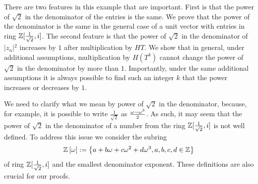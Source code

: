 \documentclass[english,journal]{extarticle}
\theoremstyle{plain}
\theoremstyle{plain}
\theoremstyle{plain}
\theoremstyle{definition}
\theoremstyle{plain}
\theoremstyle{plain}
\begin{document}
There are two features in this example that are important. First
is that the power of $\sqrt{2}$ in the denominator of the entries is
the same. We prove that the power of the denominator is the same
in the general case of a unit vector with entries in ring $\mathbb{Z}[\frac{1}{\sqrt{2}},i]$. The second
feature is that the power of $\sqrt{2}$ in the denominator of
$\left|z_{n}\right|{}^{2}$
increases by $1$ after multiplication by $HT$. We show that
in general, under additional assumptions, multiplication by
$H\left(T^{k}\right)$
cannot change the power of $\sqrt{2}$ in the denominator by more than $1$. Importantly, under the
same additional assumptions it is always possible to find such an integer
$k$ that the power increases or decreases by $1$. 

We need to clarify what we mean by power of $\sqrt{2}$ in the denominator,
because, for example, it is possible to write $\frac{1}{\sqrt{2}}$
as $\frac{\omega-\omega^{3}}{2}$.  As such, it may seem that the power of $\sqrt{2}$
in the denominator of a number from the ring $\mathbb{Z}[\frac{1}{\sqrt{2}},i]$ is not well defined.
To address this issue we consider the subring 
\[
\mathbb{Z}\left[\omega\right] := \left\{ a+b\omega+c\omega^{2}+d\omega^{3}, a,b,c,d \in \mathbb{Z} \right\}
\]
of ring $\mathbb{Z}[\frac{1}{\sqrt{2}},i]$ and the smallest denominator exponent. These definitions are also crucial
for our proofs. 
\end{document}
